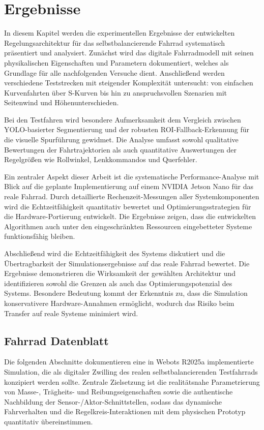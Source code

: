 \section{Ergebnisse}

In diesem Kapitel werden die experimentellen Ergebnisse der entwickelten Regelungsarchitektur für das 
selbstbalancierende Fahrrad systematisch präsentiert und analysiert.
Zunächst wird das digitale Fahrradmodell mit seinen physikalischen Eigenschaften und Parametern dokumentiert, 
welches als Grundlage für alle nachfolgenden Versuche dient. Anschließend werden verschiedene Teststrecken 
mit steigender Komplexität untersucht: von einfachen Kurvenfahrten über S-Kurven bis hin zu anspruchsvollen 
Szenarien mit Seitenwind und Höhenunterschieden. 

Bei den Testfahren wird besondere Aufmerksamkeit dem Vergleich zwischen YOLO-basierter Segmentierung 
und der robusten ROI-Fallback-Erkennung für die visuelle Spurführung gewidmet. Die Analyse umfasst sowohl qualitative 
Bewertungen der Fahrtrajektorien als auch quantitative Auswertungen der Regelgrößen wie Rollwinkel, 
Lenkkommandos und Querfehler. 

Ein zentraler Aspekt dieser Arbeit ist die systematische Performance-Analyse mit Blick auf die geplante 
Implementierung auf einem NVIDIA Jetson Nano für das reale Fahrrad. Durch detaillierte Rechenzeit-Messungen 
aller Systemkomponenten wird die Echtzeitfähigkeit quantitativ bewertet und Optimierungsstrategien für 
die Hardware-Portierung entwickelt. Die Ergebnisse zeigen, dass die entwickelten Algorithmen auch unter 
den eingeschränkten Ressourcen eingebetteter Systeme funktionsfähig bleiben.

Abschließend wird die Echtzeitfähigkeit des Systems diskutiert und die Übertragbarkeit der Simulationsergebnisse 
auf das reale Fahrrad bewertet. Die Ergebnisse demonstrieren die Wirksamkeit der gewählten Architektur und 
identifizieren sowohl die Grenzen als auch das Optimierungspotenzial des Systems. Besondere Bedeutung kommt 
der Erkenntnis zu, dass die Simulation konservativere Hardware-Annahmen ermöglicht, wodurch das Risiko 
beim Transfer auf reale Systeme minimiert wird.

\subsection{Fahrrad Datenblatt}

  Die folgenden Abschnitte dokumentieren eine in Webots R2025a implementierte Simulation, die als digitaler Zwilling des realen 
  selbstbalancierenden Testfahrrads konzipiert werden sollte. Zentrale Zielsetzung ist die 
  realitätsnahe Parametrierung von Masse-, Trägheits- und Reibungseigenschaften sowie die authentische Nachbildung der Sensor-/Aktor-Schnittstellen, 
  sodass das dynamische Fahrverhalten und die Regelkreis-Interaktionen mit dem physischen Prototyp quantitativ übereinstimmen.

